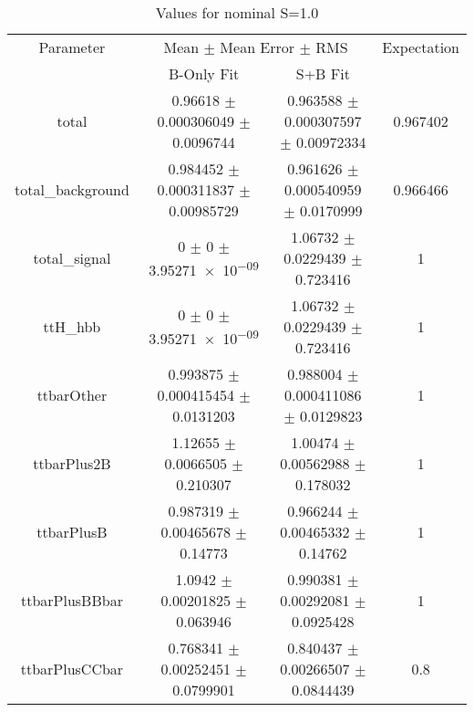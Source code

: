 \begin{table}
\centering
\caption{Values for nominal S=1.0}
\begin{tabular}{cccc}
\toprule
Parameter & \multicolumn{2}{c}{Mean $\pm$ Mean Error $\pm$ RMS} & Expectation\\
 & B-Only Fit & S+B Fit & \\
\midrule
total & \num{0.96618} $\pm$ \num{0.000306049} $\pm$ \num{0.0096744} & \num{0.963588} $\pm$ \num{0.000307597} $\pm$ \num{0.00972334} & \num{0.967402}\\
total\_background & \num{0.984452} $\pm$ \num{0.000311837} $\pm$ \num{0.00985729} & \num{0.961626} $\pm$ \num{0.000540959} $\pm$ \num{0.0170999} & \num{0.966466}\\
total\_signal & \num{0} $\pm$ \num{0} $\pm$ \num{3.95271e-09} & \num{1.06732} $\pm$ \num{0.0229439} $\pm$ \num{0.723416} & \num{1}\\
ttH\_hbb & \num{0} $\pm$ \num{0} $\pm$ \num{3.95271e-09} & \num{1.06732} $\pm$ \num{0.0229439} $\pm$ \num{0.723416} & \num{1}\\
ttbarOther & \num{0.993875} $\pm$ \num{0.000415454} $\pm$ \num{0.0131203} & \num{0.988004} $\pm$ \num{0.000411086} $\pm$ \num{0.0129823} & \num{1}\\
ttbarPlus2B & \num{1.12655} $\pm$ \num{0.0066505} $\pm$ \num{0.210307} & \num{1.00474} $\pm$ \num{0.00562988} $\pm$ \num{0.178032} & \num{1}\\
ttbarPlusB & \num{0.987319} $\pm$ \num{0.00465678} $\pm$ \num{0.14773} & \num{0.966244} $\pm$ \num{0.00465332} $\pm$ \num{0.14762} & \num{1}\\
ttbarPlusBBbar & \num{1.0942} $\pm$ \num{0.00201825} $\pm$ \num{0.063946} & \num{0.990381} $\pm$ \num{0.00292081} $\pm$ \num{0.0925428} & \num{1}\\
ttbarPlusCCbar & \num{0.768341} $\pm$ \num{0.00252451} $\pm$ \num{0.0799901} & \num{0.840437} $\pm$ \num{0.00266507} $\pm$ \num{0.0844439} & \num{0.8}\\
\bottomrule
\end{tabular}
\end{table}
